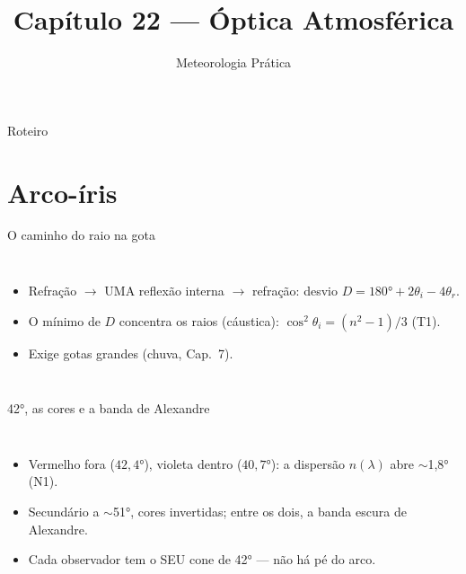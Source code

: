 \documentclass[aspectratio=169,11pt]{beamer}
\title[Cap. 22 --- Óptica Atmosférica]{Capítulo 22 --- Óptica
Atmosférica}
\subtitle{Meteorologia Prática}
\author{}
\date{}
\begin{document}
\begin{frame}
  \titlepage
  \vfill
  \atribuicao
\end{frame}

\begin{frame}{Roteiro}
  \tableofcontents
\end{frame}

\section{Arco-íris}

\begin{frame}{O caminho do raio na gota}
  \begin{columns}
    \begin{itemize}
      \item Refração $\to$ UMA reflexão interna $\to$ refração:
            desvio $D = 180° + 2\theta_i - 4\theta_r$.
      \item O \alert{mínimo} de $D$ concentra os raios (cáustica):
            $\cos^2\theta_i = (n^2-1)/3$ (T1).
      \item Exige gotas grandes (chuva, Cap.~7).
    \end{itemize}
  \end{columns}
\end{frame}

\begin{frame}{42°, as cores e a banda de Alexandre}
  \begin{columns}
    \begin{itemize}
      \item Vermelho fora ($42{,}4°$), violeta dentro ($40{,}7°$):
            a dispersão $n(\lambda)$ abre $\sim$1,8° (N1).
      \item Secundário a $\sim$51°, cores invertidas; entre os dois,
            a \alert{banda escura de Alexandre}.
      \item Cada observador tem o SEU cone de 42° — não há pé do
            arco.
    \end{itemize}
  \end{columns}
\end{frame}
\end{document}
